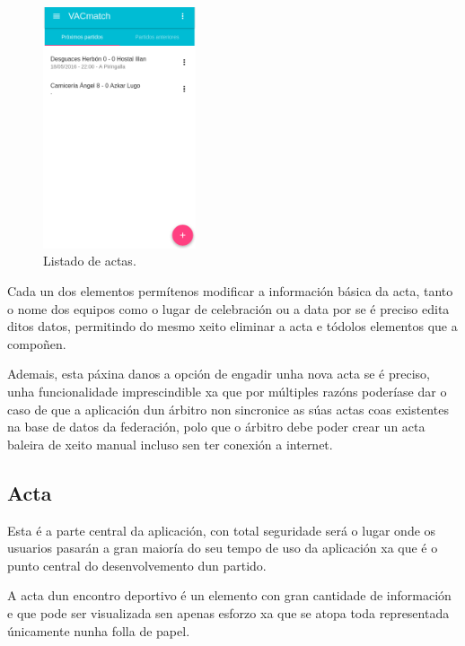       \begin{figure}[h!]
        \begin{center}
        \includegraphics[width=0.4\textwidth]{./img/demo/7_reportlist.png}
        \caption{Listado de actas.}
        \label{fig:design:listreports}
        \end{center}
      \end{figure}

    Cada un dos elementos permítenos modificar a información 
básica da acta, tanto o nome dos equipos como o lugar de celebración ou a data 
por se é preciso edita ditos datos, permitindo do mesmo xeito eliminar a acta e 
tódolos elementos que a compoñen.

    Ademais, esta páxina danos a opción de engadir unha nova acta se é preciso, 
unha funcionalidade imprescindible xa que por múltiples razóns 
poderíase dar o caso de que a aplicación dun árbitro non sincronice as súas 
actas coas existentes na base 
de datos da federación, polo que o árbitro debe poder crear un acta baleira de 
xeito manual incluso sen ter conexión a internet.

    \subsection{Acta}
    Esta é a parte central da aplicación, con total seguridade será o lugar 
onde os usuarios pasarán a gran maioría do seu tempo de uso da aplicación xa 
que é o punto central do desenvolvemento dun partido.

    A acta dun encontro deportivo é un elemento con gran cantidade de 
información e que pode ser visualizada sen apenas esforzo xa que se atopa 
toda representada únicamente nunha folla de papel.

